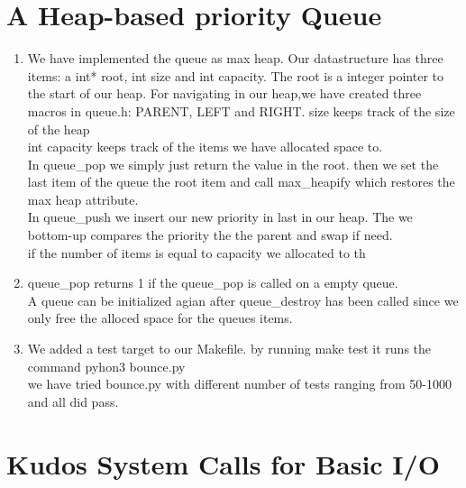 \documentclass[12pt]{article}
\begin{document}
\section*{A Heap-based priority Queue}
\begin{enumerate}
  \item We have implemented the queue as max heap. Our datastructure has three items: a int* root, int size and int capacity. The root is a integer pointer to the start of our heap. For navigating in our heap,we have created three macros in queue.h: PARENT, LEFT and RIGHT.
size keeps track of the size of the heap\\
int capacity keeps track of the items we have allocated space to.\\
In queue\_pop we simply just return the value in the root. then we set the last item of the queue the root item and call max\_heapify which restores the max heap attribute.\\
In queue\_push we insert our new priority in last in our heap. The we bottom-up compares the priority the the parent and swap if need. \\
if the number of items is equal to capacity we allocated to th
\\
\item queue\_pop returns 1 if the queue\_pop is called on a empty queue.\\
A queue can be initialized agian after queue\_destroy has been called since we only free the alloced space for the queues items.
\item We added a test target to our Makefile. by running make test it runs the command pyhon3 bounce.py\\
we have tried bounce.py with different number of tests ranging from 50-1000 and all did pass.\\
\end{enumerate}
\section*{Kudos System Calls for Basic I/O}  
\end{document}
